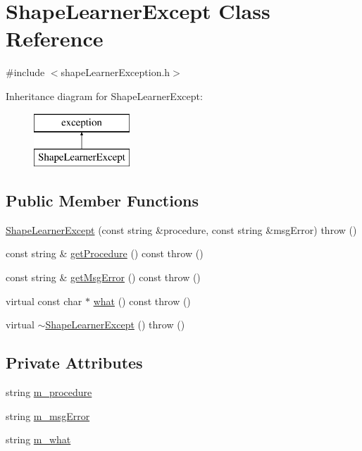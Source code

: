\hypertarget{class_shape_learner_except}{}\section{Shape\+Learner\+Except Class Reference}
\label{class_shape_learner_except}


{\ttfamily \#include $<$shape\+Learner\+Exception.\+h$>$}

Inheritance diagram for Shape\+Learner\+Except\+:\begin{figure}[H]
\begin{center}
\leavevmode
\includegraphics[height=2.000000cm]{d1/d23/class_shape_learner_except}
\end{center}
\end{figure}
\subsection*{Public Member Functions}
\begin{DoxyCompactItemize}
\item 
\hyperlink{class_shape_learner_except_aa83d39d1ca7534e52bf271338087c5f3}{Shape\+Learner\+Except} (const string \&procedure, const string \&msg\+Error)  throw ()
\item 
const string \& \hyperlink{class_shape_learner_except_a81a4be87b37314ccaa03082eb71e2346}{get\+Procedure} () const   throw ()
\item 
const string \& \hyperlink{class_shape_learner_except_ab11e5e57c2a0dddbc6558ce280b9c164}{get\+Msg\+Error} () const   throw ()
\item 
virtual const char $\ast$ \hyperlink{class_shape_learner_except_a32c65ebd6f59c4428d26fb0657803fc8}{what} () const   throw ()
\item 
virtual \hyperlink{class_shape_learner_except_ad4409591b2b570a091d3c7d78b3ceccf}{$\sim$\+Shape\+Learner\+Except} ()  throw ()
\end{DoxyCompactItemize}
\subsection*{Private Attributes}
\begin{DoxyCompactItemize}
\item 
string \hyperlink{class_shape_learner_except_a78ec6f2fe86e83a6d427fbdf490a52c5}{m\+\_\+procedure}
\item 
string \hyperlink{class_shape_learner_except_a3d6849e39d06da74b05e772b6d7e318d}{m\+\_\+msg\+Error}
\item 
string \hyperlink{class_shape_learner_except_a603590cdc8d3a686cff87a5ce1d5c5f2}{m\+\_\+what}
\end{DoxyCompactItemize}


